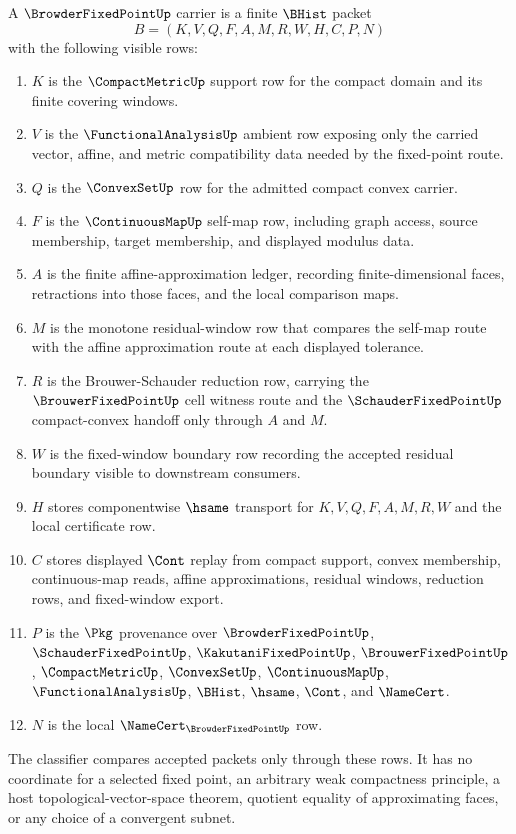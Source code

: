\begin{definition}
\label{def:browder-fixed-point-carrier}
A $\BrowderFixedPointUp$ carrier is a finite $\BHist$ packet
$$
B=(K,V,Q,F,A,M,R,W,H,C,P,N)
$$
with the following visible rows:
\begin{enumerate}
\item $K$ is the $\CompactMetricUp$ support row for the compact domain and its finite covering windows.
\item $V$ is the $\FunctionalAnalysisUp$ ambient row exposing only the carried vector, affine, and metric compatibility data needed by the fixed-point route.
\item $Q$ is the $\ConvexSetUp$ row for the admitted compact convex carrier.
\item $F$ is the $\ContinuousMapUp$ self-map row, including graph access, source membership, target membership, and displayed modulus data.
\item $A$ is the finite affine-approximation ledger, recording finite-dimensional faces, retractions into those faces, and the local comparison maps.
\item $M$ is the monotone residual-window row that compares the self-map route with the affine approximation route at each displayed tolerance.
\item $R$ is the Brouwer-Schauder reduction row, carrying the $\BrouwerFixedPointUp$ cell witness route and the $\SchauderFixedPointUp$ compact-convex handoff only through $A$ and $M$.
\item $W$ is the fixed-window boundary row recording the accepted residual boundary visible to downstream consumers.
\item $H$ stores componentwise $\hsame$ transport for $K,V,Q,F,A,M,R,W$ and the local certificate row.
\item $C$ stores displayed $\Cont$ replay from compact support, convex membership, continuous-map reads, affine approximations, residual windows, reduction rows, and fixed-window export.
\item $P$ is the $\Pkg$ provenance over $\BrowderFixedPointUp$, $\SchauderFixedPointUp$, $\KakutaniFixedPointUp$, $\BrouwerFixedPointUp$, $\CompactMetricUp$, $\ConvexSetUp$, $\ContinuousMapUp$, $\FunctionalAnalysisUp$, $\BHist$, $\hsame$, $\Cont$, and $\NameCert$.
\item $N$ is the local $\NameCert_{\BrowderFixedPointUp}$ row.
\end{enumerate}
The classifier compares accepted packets only through these rows. It has no coordinate for a selected fixed point, an arbitrary weak compactness principle, a host topological-vector-space theorem, quotient equality of approximating faces, or any choice of a convergent subnet.
\end{definition}

